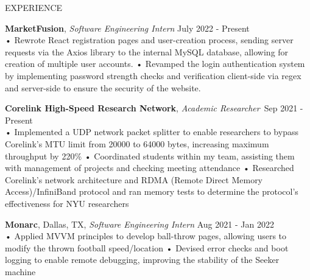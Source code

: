 \documentclass{resume} %
\begin{document}
\begin{rSection}{EXPERIENCE}

\textbf{MarketFusion}, {\emph{Software Engineering Intern}} \hfill July 2022 - Present\\
• Rewrote React registration pages and user-creation process, sending server requests via the Axios library to the internal MySQL database, allowing for creation of multiple user accounts. \newline
• Revamped the login authentication system by implementing password strength checks and verification client-side via regex and server-side to ensure the security of the website. \smallskip

\textbf{Corelink High-Speed Research Network}, {\emph{Academic Researcher}}\ \hfill Sep 2021 - Present \\
• Implemented a UDP network packet splitter to enable researchers to bypass Corelink's MTU limit from 20000 to 64000 bytes, increasing maximum throughput by 220\% \newline
• Coordinated students within my team, assisting them with management of projects and checking meeting attendance \newline    
• Researched Corelink’s network architecture and RDMA (Remote Direct Memory Access)/InfiniBand protocol and ran memory tests to determine the protocol's effectiveness for NYU researchers

\textbf{Monarc}, Dallas, TX, {\emph{Software Engineering Intern}} \hfill Aug 2021 - Jan 2022\\
• Applied MVVM principles to develop ball-throw pages, allowing users to modify the thrown football speed/location \newline  %
• Devised error checks and boot logging to enable remote debugging, improving the stability of the Seeker machine \smallskip
\end{rSection} 
\end{document}
